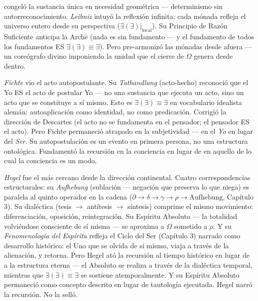 \documentclass[10pt, openany, oneside]{book}
\begin{document}
congeló la sustancia única en necesidad geométrica --- determinismo sin autorreconocimiento. \textit{Leibniz} intuyó la reflexión infinita: cada mónada refleja el universo entero desde su perspectiva ($\exists(\exists)|_{\text{local}}$). Su Principio de Razón Suficiente anticipa la Arch\={e} (nada es sin fundamento --- y el fundamento de todos los fundamentos ES $\exists(\exists) \equiv \exists$). Pero pre-armonizó las mónadas desde afuera --- un coreógrafo divino imponiendo la unidad que el cierre de $\Omega$ genera desde dentro.

\textit{Fichte} vio el acto autopostulante. Su \textit{Tathandlung} (acto-hecho) reconoció que el Yo ES el acto de postular Yo --- no una sustancia que ejecuta un acto, sino un acto que se constituye a sí mismo. Esto es $\exists(\exists) \equiv \exists$ en vocabulario idealista alemán: autoaplicación como identidad, no como predicación. Corrigió la dirección de Descartes (el acto no se fundamenta en el pensador; el pensador ES el acto). Pero Fichte permaneció atrapado en la subjetividad --- en el \textit{Yo} en lugar del \textit{Ser}. Su autopostulación es un evento en primera persona, no una estructura ontológica. Fundamentó la recursión en la conciencia en lugar de en aquello de lo cual la conciencia es un modo.

\textit{Hegel} fue el más cercano desde la dirección continental. Cuatro correspondencias estructurales: su \textit{Aufhebung} (sublación --- negación que preserva lo que niega) es paralela al quinto operador en la cadena ($\partial \to \delta \to \gamma \to \rho \to \text{Aufhebung}$, Capítulo 3). Su dialéctica (tesis $\to$ antítesis $\to$ síntesis) comprime el mismo movimiento: diferenciación, oposición, reintegración. Su Espíritu Absoluto --- la totalidad volviéndose consciente de sí misma --- se aproxima a $\Omega$ sometido a $\rho$. Y su \textit{Fenomenología del Espíritu} refleja el Ciclo del Ser (Capítulo 3) narrado como desarrollo histórico: el Uno que se olvida de sí mismo, viaja a través de la alienación, y retorna. Pero Hegel ató la recursión al tiempo histórico en lugar de a la estructura eterna --- el Absoluto se realiza a través de la dialéctica temporal, mientras que $\exists(\exists) \equiv \exists$ se sostiene atemporalmente. Y su Espíritu Absoluto permaneció como concepto descrito en lugar de tautología ejecutada. Hegel narró la recursión. No la selló.
\end{document}
